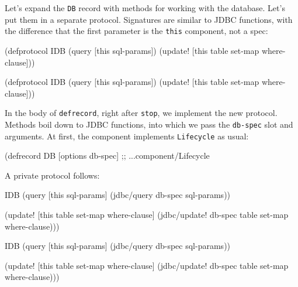Let's expand the \verb|DB| record with methods for working with the database. Let's put them in a separate protocol. Signatures are similar to JDBC functions, with the difference that the first parameter is the \verb|this| component, not a spec:


\ifnarrow

\begin{english}
  \begin{clojure}
(defprotocol IDB
  (query [this sql-params])
  (update!
    [this table set-map where-clause]))
  \end{clojure}
\end{english}

\else

\begin{english}
  \begin{clojure}
(defprotocol IDB
  (query [this sql-params])
  (update! [this table set-map where-clause]))
  \end{clojure}
\end{english}

\fi

In the body of \verb|defrecord|, right after \verb|stop|, we implement the new protocol. Methods boil down to JDBC functions, into which we pass the \verb|db-spec| slot and arguments. At first, the component implements \verb|Lifecycle| as usual:

\begin{english}
  \begin{clojure}
(defrecord DB [options db-spec]
  ;; ...component/Lifecycle
  \end{clojure}
\end{english}

\noindent
A private protocol follows:

\ifnarrow

\begin{english}
  \begin{clojure}
  IDB
  (query [this sql-params]
    (jdbc/query db-spec sql-params))

  (update!
    [this table set-map where-clause]
    (jdbc/update! db-spec
      table set-map where-clause)))
  \end{clojure}
\end{english}

\else

\begin{english}
  \begin{clojure}
  IDB
  (query [this sql-params]
    (jdbc/query db-spec sql-params))

  (update! [this table set-map where-clause]
    (jdbc/update! db-spec table set-map where-clause)))
  \end{clojure}
\end{english}

